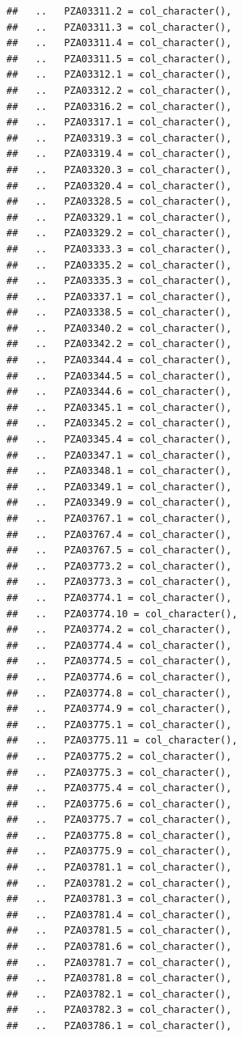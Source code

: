 \documentclass[
]{article}
\begin{document}
\begin{verbatim}
##   ..   PZA03311.2 = col_character(),
##   ..   PZA03311.3 = col_character(),
##   ..   PZA03311.4 = col_character(),
##   ..   PZA03311.5 = col_character(),
##   ..   PZA03312.1 = col_character(),
##   ..   PZA03312.2 = col_character(),
##   ..   PZA03316.2 = col_character(),
##   ..   PZA03317.1 = col_character(),
##   ..   PZA03319.3 = col_character(),
##   ..   PZA03319.4 = col_character(),
##   ..   PZA03320.3 = col_character(),
##   ..   PZA03320.4 = col_character(),
##   ..   PZA03328.5 = col_character(),
##   ..   PZA03329.1 = col_character(),
##   ..   PZA03329.2 = col_character(),
##   ..   PZA03333.3 = col_character(),
##   ..   PZA03335.2 = col_character(),
##   ..   PZA03335.3 = col_character(),
##   ..   PZA03337.1 = col_character(),
##   ..   PZA03338.5 = col_character(),
##   ..   PZA03340.2 = col_character(),
##   ..   PZA03342.2 = col_character(),
##   ..   PZA03344.4 = col_character(),
##   ..   PZA03344.5 = col_character(),
##   ..   PZA03344.6 = col_character(),
##   ..   PZA03345.1 = col_character(),
##   ..   PZA03345.2 = col_character(),
##   ..   PZA03345.4 = col_character(),
##   ..   PZA03347.1 = col_character(),
##   ..   PZA03348.1 = col_character(),
##   ..   PZA03349.1 = col_character(),
##   ..   PZA03349.9 = col_character(),
##   ..   PZA03767.1 = col_character(),
##   ..   PZA03767.4 = col_character(),
##   ..   PZA03767.5 = col_character(),
##   ..   PZA03773.2 = col_character(),
##   ..   PZA03773.3 = col_character(),
##   ..   PZA03774.1 = col_character(),
##   ..   PZA03774.10 = col_character(),
##   ..   PZA03774.2 = col_character(),
##   ..   PZA03774.4 = col_character(),
##   ..   PZA03774.5 = col_character(),
##   ..   PZA03774.6 = col_character(),
##   ..   PZA03774.8 = col_character(),
##   ..   PZA03774.9 = col_character(),
##   ..   PZA03775.1 = col_character(),
##   ..   PZA03775.11 = col_character(),
##   ..   PZA03775.2 = col_character(),
##   ..   PZA03775.3 = col_character(),
##   ..   PZA03775.4 = col_character(),
##   ..   PZA03775.6 = col_character(),
##   ..   PZA03775.7 = col_character(),
##   ..   PZA03775.8 = col_character(),
##   ..   PZA03775.9 = col_character(),
##   ..   PZA03781.1 = col_character(),
##   ..   PZA03781.2 = col_character(),
##   ..   PZA03781.3 = col_character(),
##   ..   PZA03781.4 = col_character(),
##   ..   PZA03781.5 = col_character(),
##   ..   PZA03781.6 = col_character(),
##   ..   PZA03781.7 = col_character(),
##   ..   PZA03781.8 = col_character(),
##   ..   PZA03782.1 = col_character(),
##   ..   PZA03782.3 = col_character(),
##   ..   PZA03786.1 = col_character(),

\end{verbatim}
\end{document}
